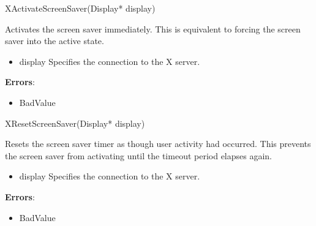 \documentclass{report}
\begin{document}
\begin{itemize}
        \begin{cppcode}
            XActivateScreenSaver(Display* display)
        \end{cppcode}
        \bigbreak \noindent
        Activates the screen saver immediately. This is equivalent to forcing the screen saver into the active state.
        \begin{itemize}
            \item display Specifies the connection to the X server.
        \end{itemize}
        \bigbreak \noindent
        \textbf{Errors}:
        \begin{itemize}
            \item BadValue
        \end{itemize}

        \begin{cppcode}
            XResetScreenSaver(Display* display)
        \end{cppcode}
        \bigbreak \noindent
        Resets the screen saver timer as though user activity had occurred. This prevents the screen saver from activating until the timeout period elapses again.
        \begin{itemize}
            \item display Specifies the connection to the X server.
        \end{itemize}
        \bigbreak \noindent
        \textbf{Errors}:
        \begin{itemize}
            \item BadValue
        \end{itemize}


\end{itemize}
\end{document}
